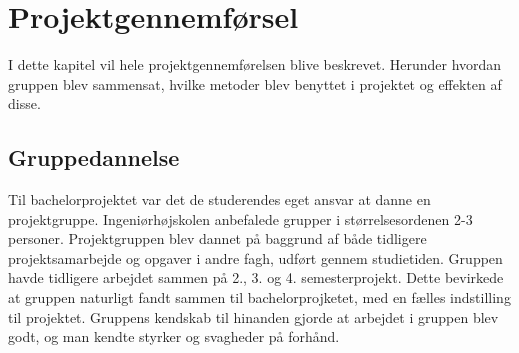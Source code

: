 \chapter{Projektgennemførsel}
I dette kapitel vil hele projektgennemførelsen blive beskrevet. Herunder hvordan
gruppen blev sammensat, hvilke metoder blev benyttet i projektet og effekten af disse.

\section{Gruppedannelse}
Til bachelorprojektet var det de studerendes eget ansvar at danne en projektgruppe. 
Ingeniørhøjskolen anbefalede grupper i størrelsesordenen 2-3 personer. Projektgruppen
blev dannet på baggrund af både tidligere projektsamarbejde og opgaver i andre fagh, udført gennem studietiden. 
Gruppen havde tidligere arbejdet sammen på 2., 3. og 4. semesterprojekt.
Dette bevirkede at gruppen naturligt fandt sammen til bachelorprojketet, med en fælles indstilling til projektet.
Gruppens kendskab til hinanden gjorde at arbejdet i gruppen blev godt, og man kendte styrker og svagheder på forhånd. \\